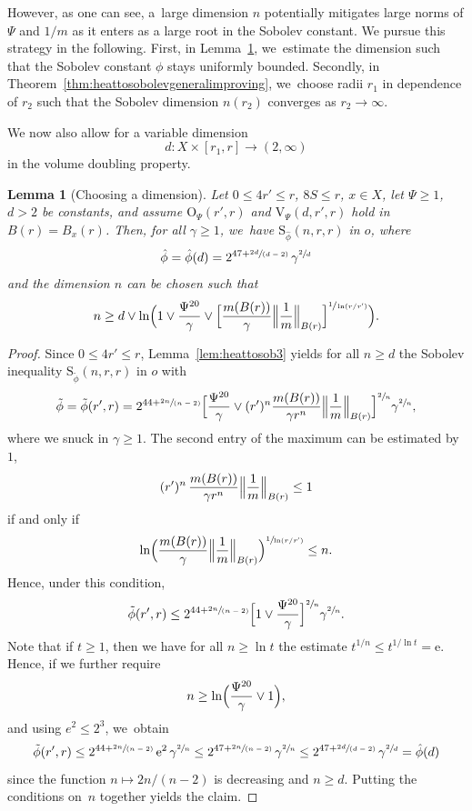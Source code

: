 \documentclass[10pt]{amsart}
\newcommand{\spfrac}[2]{\sfrac{#1}{(#2)}}
\newcommand{\rS}{\mathrm{S}}
\newcommand{\rV}{\mathrm{V}}
\newcommand{\rO}{\mathrm{O}}
\theoremstyle{plain}
\newtheorem{lemma}[theorem]{Lemma}
\theoremstyle{definition}
\newcommand{\euler}{\mathrm{e}}
\begin{document}
However, as one can see, a~large dimension $ n $ potentially mitigates large norms of $ \Psi $ and $ 1/m $ as it enters as a large root in the Sobolev constant. We pursue this strategy in the following. First, in Lemma~\ref{lem:variabledim1}, we~estimate the dimension such that the Sobolev constant $ \phi $ stays uniformly bounded. Secondly, in Theorem~\ref{thm:heattosobolevgeneralimproving}, we~choose radii $ r_{1} $ in dependence of $ r_{2} $ such that the Sobolev dimension $ n(r_{2}) $ converges as $ r_{2}\to \infty $.

We now also allow for a variable dimension
\[
d\colon X\times [r_1,r]\to (2,\infty)
\]
in the volume doubling property.

\begin{lemma}[Choosing a dimension]\label{lem:variabledim1}Let
$0\leq {4}r'\leq r$, $8S\leq r$, $ x\in X $, let $\Psi\geq 1$, $d>2$ be constants, and assume $\rO_\Psi(r',r)$ and
$\rV_\Psi (d,r',r)$ hold in $B(r)=B_{x}(r)$.
Then, for all $\gamma\geq 1$, we~have $\rS_{\hat \phi}(n,r,r)$ in $o$, where
\[
\hat{\phi}=\hat{\phi}(d)=2^{47+\spfrac{2d}{d-2}}\,
\gamma^{\sfrac{2}{d}}
\]
and the dimension $ n $ can be chosen such that
\[
n\geq d\vee
\ln
\Bigl(1\vee
\frac{\Psi^{20}}{\gamma}\vee
\Bigl[\frac{m(B(r))}{\gamma} \Bigl\|\frac1m \Bigr\|_{B(r)}
\Bigr]^{\sfrac{1}{\ln ({r}/{r'})}}
\Bigr).
\]
\end{lemma}

\begin{proof}
Since $0\leq {4}r'\leq r$, Lemma~\ref{lem:heattosob3}
yields for all $n\geq d$ the Sobolev inequality $\rS_{\tilde{\phi}}(n,r,r)$ in $o$ with
\[
\tilde{\phi}=\tilde{\phi}(r',r)=2^{44+\spfrac{2n}{n-2}}
\Bigl[\frac{\Psi^{20}}\gamma\vee (r')^n\frac{m(B(r))}{\gamma r^{n}} \Bigl\Vert\frac1m \Bigr\Vert_{B(r)} \Bigr]^{\sfrac{2}{n}}\gamma^{\sfrac{2}{n}},
\]
where we snuck in $\gamma\geq 1$. The second entry of the maximum can be estimated by~$1$,~\ie
\[
(r')^n\,\frac{m(B(r))}{\gamma r^n} \Bigl\Vert\frac1m \Bigr\Vert_{B(r)}\leq 1
\]
if and only if
\[
\ln \Bigl(\frac{m(B(r))}\gamma\Bigl\Vert\frac1m\Bigr\Vert_{B(r)}\Bigr)^{\sfrac{1}{{\ln ({r}/{r'})}}}\leq n.
\]
Hence, under this condition,
\[
\tilde\phi(r',r)\leq 2^{44+\spfrac{2n}{n-2}}
\Bigl[1\vee \frac{\Psi^{20}}\gamma\Bigr]^{\sfrac{2}{n}}\gamma^{\sfrac{2}{n}}.
\]
Note that if $t\geq 1$, then we have for all $n\geq \ln t$ the estimate $t^{1/n}\leq t^{1/\ln t}=\euler$. Hence, if we further require
\[
n\geq \ln\Bigl(\frac{\Psi^{20}}\gamma\vee 1\Bigr),
\]
and using $e^2\leq 2^3$, we~obtain
\[
\tilde{\phi}(r',r)\leq 2^{44+\spfrac{2n}{n-2}}\,
\euler^2\,\gamma^{\sfrac{2}{n}}\leq 2^{47+\spfrac{2n}{n-2}}\,
\gamma^{\sfrac{2}{n}}\leq 2^{47+\spfrac{2d}{d-2}}\,
\gamma^{\sfrac{2}{d}}=\hat{\phi}(d)
\]
since the function $ n\mapsto 2n/(n-2) $ is decreasing and $ n\ge d $.
Putting the conditions on~$n$ together yields the claim.
\end{proof}
\end{document}
